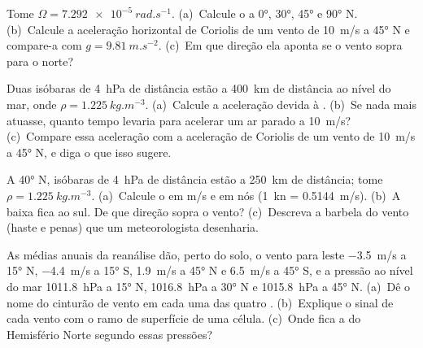 \begin{exercise}[$\star$]\label{exo:b1:atmospheric-circulation:1}
Tome $\Omega = \qty{7.292e-5}{rad.s^{-1}}$. (a)~Calcule o  a \ang{0}, \ang{30},
\ang{45} e \ang{90} N. (b)~Calcule a aceleração horizontal de Coriolis de um vento de \qty{10}{m/s} a
\ang{45} N e compare-a com $g =
\qty{9.81}{m.s^{-2}}$. (c)~Em que direção ela aponta se o vento sopra para o norte?
\end{exercise}

\begin{exercise}[$\star$]\label{exo:b1:atmospheric-circulation:2}
Duas isóbaras de \qty{4}{hPa} de distância estão a \qty{400}{km} de distância ao nível do mar, onde
$\rho =
\qty{1.225}{kg.m^{-3}}$. (a)~Calcule a aceleração devida à . (b)~Se nada
mais atuasse, quanto tempo levaria para acelerar um ar parado a \qty{10}{m/s}? (c)~Compare essa
aceleração com a aceleração de Coriolis de um vento de \qty{10}{m/s} a \ang{45} N, e diga o que isso sugere.
\end{exercise}

\begin{exercise}[$\star$]\label{exo:b1:atmospheric-circulation:3}
A \ang{40} N, isóbaras de \qty{4}{hPa} de distância estão a \qty{250}{km} de distância; tome $\rho =
\qty{1.225}{kg.m^{-3}}$. (a)~Calcule o  em \unit{m/s} e em nós (\qty{1}{kn} =
\qty{0.5144}{m/s}). (b)~A baixa fica ao sul. De que direção sopra o vento? (c)~Descreva a barbela do
vento (haste e penas) que um meteorologista desenharia.
\end{exercise}

\begin{exercise}[$\star$]\label{exo:b1:atmospheric-circulation:4}
As médias anuais da reanálise dão, perto do solo, o vento para leste \qty{-3.5}{m/s} a \ang{15} N,
\qty{-4.4}{m/s} a \ang{15} S, \qty{+1.9}{m/s} a \ang{45} N e \qty{+6.5}{m/s} a \ang{45} S, e a pressão
ao nível do mar \qty{1011.8}{hPa} a \ang{15} N, \qty{1016.8}{hPa} a \ang{30} N e \qty{1015.8}{hPa} a
\ang{45} N. (a)~Dê o nome do cinturão de vento em cada uma das quatro . (b)~Explique o sinal de
cada vento com o ramo de superfície de uma célula. (c)~Onde fica a  do Hemisfério Norte
segundo essas pressões?
\end{exercise}

